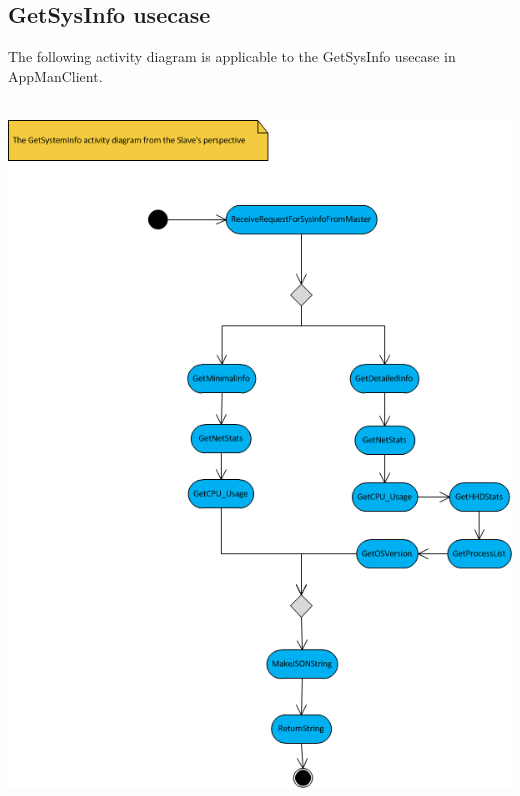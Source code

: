 \documentclass[a4paper,12pt,final]{article}
\begin{document}
\subsection{GetSysInfo usecase}
The following activity diagram is applicable to the GetSysInfo usecase in AppManClient.\\
\textbf{\\}
\begin{center}
\includegraphics[scale=1]{GetSystemInfoActivitySLAVE.png}
\end{center}
\end{document}
